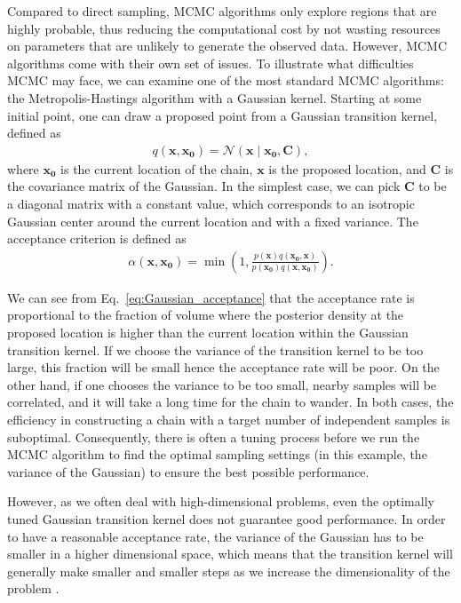 \documentclass[twocolumn]{aastex631}
\begin{document}
Compared to direct sampling, MCMC algorithms only explore regions that are
highly probable, thus reducing the computational cost by not wasting resources
on parameters that are unlikely to generate the observed data. However, MCMC
algorithms come with their own set of issues. To illustrate what difficulties
MCMC may face, we can examine one of the most standard MCMC algorithms: the
Metropolis-Hastings algorithm with a Gaussian kernel. Starting at some initial
point, one can draw a proposed point from a Gaussian transition kernel, defined
as
\begin{align}
    q(\mathbf{x},\mathbf{x_0})= \mathcal{N}(\mathbf{x} \mid \mathbf{x_0},\mathbf{C}),
\end{align}
where $\mathbf{x_0}$ is the current location of the chain, $\mathbf{x}$ is the
proposed location, and $\mathbf{C}$ is the covariance matrix of the Gaussian. In
the simplest case, we can pick $\mathbf{C}$ to be a diagonal matrix with a
constant value, which corresponds to an isotropic Gaussian center around the
current location and with a fixed variance. The acceptance criterion is
defined as
\begin{align}
\alpha(\mathbf{x},\mathbf{x_0}) = \min\left(1,\frac{p(\mathbf{x})q(\mathbf{x_0},\mathbf{x})}{p(\mathbf{x_0})q(\mathbf{x},\mathbf{x_0})}\right).
\label{eq:Gaussian_acceptance}
\end{align}

We can see from Eq.~\eqref{eq:Gaussian_acceptance} that the acceptance rate is
proportional to the fraction of volume where the posterior density at the
proposed location is higher than the current location within the Gaussian
transition kernel. If we choose the variance of the transition kernel to be too
large, this fraction will be small hence the acceptance rate will be poor. On
the other hand, if one chooses the variance to be too small, nearby samples
will be correlated, and it will take a long time for the chain to wander. In
both cases, the efficiency in constructing a chain with a target number of
independent samples is suboptimal. Consequently, there is often a tuning
process before we run the MCMC algorithm to find the optimal sampling settings
(in this example, the variance of the Gaussian) to ensure the best possible
performance. 

However, as we often deal with high-dimensional problems, even the optimally
tuned Gaussian transition kernel does not guarantee good performance. In order
to have a reasonable acceptance rate, the variance of the Gaussian has to be
smaller in a higher dimensional space, which means that the transition kernel
will generally make smaller and smaller steps as we increase the dimensionality
of the problem \citep{2017arXiv170102434B}.
\end{document}
